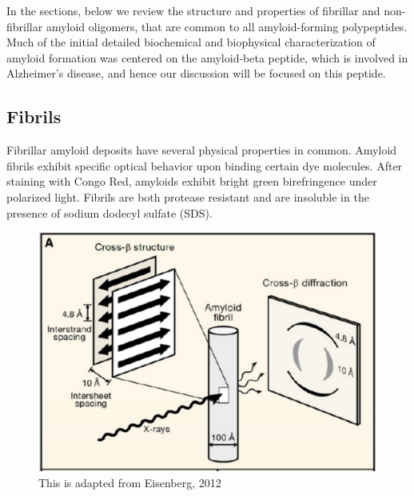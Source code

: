 In the sections, below we review the structure and properties of fibrillar and non-fibrillar amyloid oligomers, that are common to all amyloid-forming polypeptides.  Much of the initial detailed biochemical and biophysical characterization of amyloid formation was centered on the amyloid-beta peptide, which is involved in Alzheimer's disease, and hence our discussion will be focused on this peptide. %

\subsection{Fibrils}

Fibrillar amyloid deposits have several physical properties in common. Amyloid fibrils exhibit specific optical behavior upon binding certain dye molecules. After staining with Congo Red, amyloids exhibit bright green birefringence under polarized light. Fibrils are both protease resistant and are insoluble in the presence of sodium dodecyl sulfate (SDS).  

\begin{figure}
  \centering
  \includegraphics[width=6in]{figures/introduction/fibril_structure_diffraction.pdf}
  \caption[Characteristic cross-$\beta$ spacings from X-ray fibre diffraction studies of amyloid fibrils]{This is adapted from Eisenberg, 2012}
  \label{fig:fibril_diffraction}
\end{figure}

